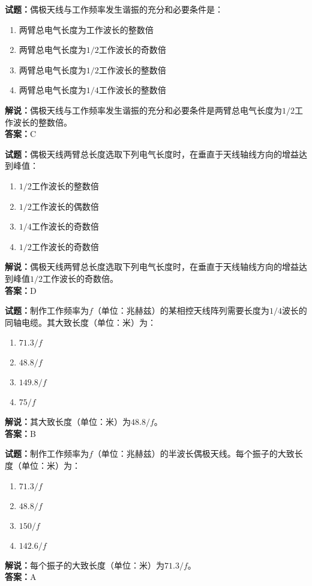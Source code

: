 \documentclass{ctexbook}
\begin{document}
\vspace{1em}

\textbf{试题：}偶极天线与工作频率发生谐振的充分和必要条件是：
\begin{enumerate}[leftmargin=3em]
  \item 两臂总电气长度为工作波长的整数倍
  \item 两臂总电气长度为\(1/2\)工作波长的奇数倍
  \item 两臂总电气长度为\(1/2\)工作波长的整数倍
  \item 两臂总电气长度为\(1/4\)工作波长的整数倍
\end{enumerate}
\noindent\textbf{解说：}偶极天线与工作频率发生谐振的充分和必要条件是两臂总电气长度为\(1/2\)工作波长的整数倍。\\\noindent\textbf{答案：}C

\vspace{1em}

\textbf{试题：}偶极天线两臂总长度选取下列电气长度时，在垂直于天线轴线方向的增益达到峰值：
\begin{enumerate}[leftmargin=3em]
  \item \(1/2\)工作波长的整数倍
  \item \(1/2\)工作波长的偶数倍
  \item \(1/4\)工作波长的奇数倍
  \item \(1/2\)工作波长的奇数倍
\end{enumerate}
\noindent\textbf{解说：}偶极天线两臂总长度选取下列电气长度时，在垂直于天线轴线方向的增益达到峰值\(1/2\)工作波长的奇数倍。\\
\noindent\textbf{答案：}D

\vspace{1em}

\textbf{试题：}制作工作频率为\(f\)（单位：兆赫兹）的某相控天线阵列需要长度为\(1/4\)波长的同轴电缆。其大致长度（单位：米）为：
\begin{enumerate}[leftmargin=3em]
  \item \(71.3 / f\)
  \item \(48.8 / f\)
  \item \(149.8 / f\)
  \item \(75 / f\)
\end{enumerate}
\noindent\textbf{解说：}其大致长度（单位：米）为\(48.8 / f\)。\\
\noindent\textbf{答案：}B

\vspace{1em}

\textbf{试题：}制作工作频率为\(f\)（单位：兆赫兹）的半波长偶极天线。每个振子的大致长度（单位：米）为：
\begin{enumerate}[leftmargin=3em]
  \item \(71.3 / f\)
  \item \(48.8 / f\)
  \item \(150 / f\)
  \item \(142.6 / f\)
\end{enumerate}
\noindent\textbf{解说：}每个振子的大致长度（单位：米）为\(71.3 / f\)。\\
\noindent\textbf{答案：}A
\end{document}
